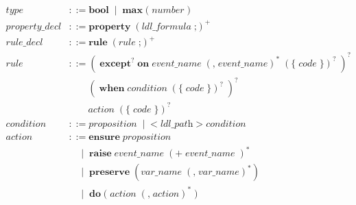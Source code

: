\documentclass[preview=true]{standalone}
\newcommand{\token}[1]{\textbf{#1}}
\begin{document}
\begin{table}[t]
\begin{align*}
  \textit{type} &::=
    \token{bool}\;
    \mid\; \token{max}\; \texttt{(}\; \textit{number}\; \texttt{)}
  \\
  \textit{property\_decl} &::=
  \token{property}\;
  \left(\textit{ldl\_formula}\; \texttt{;}\right)^+
  \\
  \textit{rule\_decl} &::= \token{rule}\;
  \left(\textit{rule}\; \texttt{;}\right)^+
  \\
  \textit{rule} &::=
  \left(\;
  \token{except}^?\; \token{on}\; \textit{event\_name}\;
  \left(\texttt{,}\; \textit{event\_name}\right)^\ast\;
  \left( \token{\{}\; \textit{code}\; \token{\}} \right)^?\;
  \right)^?\;
  \\&\qquad
  \left(\;
  \token{when}\; \textit{condition}\;
  \left( \token{\{}\; \textit{code}\; \token{\}} \right)^?\;
  \right)^?
  \\&\qquad
  \textit{action}\;
  \left( \token{\{}\; \textit{code}\; \token{\}} \right)^?\;
  \\
  \textit{condition} &::= \textit{proposition}\;
  \mid\;
  \texttt{<}\; \textit{ldl\_path}\; \texttt{>}\; \textit{condition}
  \\
  \textit{action} &::=
  \token{ensure}\; \textit{proposition}
  \\&\quad
  \mid\;
  \token{raise}\; \textit{event\_name}\; \left(\texttt{+}\; \textit{event\_name}\; \right)^\ast
  \\&\quad
  \mid\;
  \token{preserve}\; (\textit{var\_name}\; (\texttt{,}\; \textit{var\_name})^\ast)
  \\&\quad
  \mid\;
  \token{do}\;
    \texttt{(}\;
    \textit{action}\; \left(\texttt{,}\; \textit{action}\right)^\ast\;
    \texttt{)}
\end{align*}
\end{table}
\smallskip
\end{document}
